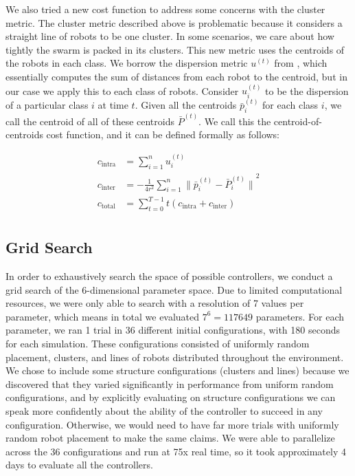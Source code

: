 \documentclass[conference]{IEEEtran}
\begin{document}
    We also tried a new cost function to address some concerns with the cluster metric. The cluster metric described above is problematic because it considers a straight line of robots to be one cluster. In some scenarios, we care about how tightly the swarm is packed in its clusters. This new metric uses the centroids of the robots in each class. We borrow the dispersion metric $u^{(t)}$ from \cite{gauci_self-organized_2014}, which essentially computes the sum of distances from each robot to the centroid, but in our case we apply this to each class of robots. Consider $u_i^{(t)}$ to be the dispersion of a particular class $i$ at time $t$. Given all the centroids $\bar{p}_i^{(t)}$ for each class $i$, we call the centroid of all of these centroids $\bar{P}^{(t)}$. We call this the centroid-of-centroids cost function, and it can be defined formally as follows:

    \begin{align*}
    c_{\text{intra}} &= \sum_{i=1}^n u_i^{(t)} \\
    c_{\text{inter}} &= -\frac{1} {4r^2}\sum_{i=1}^n{\lVert \bar{p}_i^{(t)} - \bar{P}_i^{(t)} \rVert}^2 \\
    c_{\text{total}} &=  \sum_{t=0}^{T-1} t (c_{\text{intra}} + c_{\text{inter}}) \\
    \end{align*}

  \subsection{Grid Search}

    In order to exhaustively search the space of possible controllers, we conduct a grid search of the 6-dimensional parameter space. Due to limited computational resources, we were only able to search with a resolution of 7 values per parameter, which means in total we evaluated $7^6=117649$ parameters. For each parameter, we ran 1 trial in 36 different initial configurations, with 180 seconds for each simulation. These configurations consisted of uniformly random placement, clusters, and lines of robots distributed throughout the environment. We chose to include some structure configurations (clusters and lines) because we discovered that they varied significantly in performance from uniform random configurations, and by explicitly evaluating on structure configurations we can speak more confidently about the ability of the controller to succeed in any configuration. Otherwise, we would need to have far more trials with uniformly random robot placement to make the same claims. We were able to parallelize across the 36 configurations and run at 75x real time, so it took approximately 4 days to evaluate all the controllers.
\end{document}
